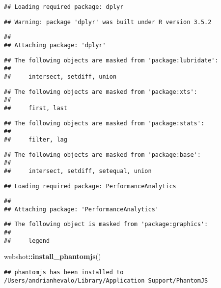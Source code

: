 \documentclass[]{article}
\newenvironment{Shaded}{\begin{snugshade}}{\end{snugshade}}
\newcommand{\KeywordTok}[1]{\textcolor[rgb]{0.13,0.29,0.53}{\textbf{#1}}}
\newcommand{\OperatorTok}[1]{\textcolor[rgb]{0.81,0.36,0.00}{\textbf{#1}}}
\newcommand{\NormalTok}[1]{#1}
\begin{document}
\begin{verbatim}
## Loading required package: dplyr
\end{verbatim}

\begin{verbatim}
## Warning: package 'dplyr' was built under R version 3.5.2
\end{verbatim}

\begin{verbatim}
## 
## Attaching package: 'dplyr'
\end{verbatim}

\begin{verbatim}
## The following objects are masked from 'package:lubridate':
## 
##     intersect, setdiff, union
\end{verbatim}

\begin{verbatim}
## The following objects are masked from 'package:xts':
## 
##     first, last
\end{verbatim}

\begin{verbatim}
## The following objects are masked from 'package:stats':
## 
##     filter, lag
\end{verbatim}

\begin{verbatim}
## The following objects are masked from 'package:base':
## 
##     intersect, setdiff, setequal, union
\end{verbatim}

\begin{verbatim}
## Loading required package: PerformanceAnalytics
\end{verbatim}

\begin{verbatim}
## 
## Attaching package: 'PerformanceAnalytics'
\end{verbatim}

\begin{verbatim}
## The following object is masked from 'package:graphics':
## 
##     legend
\end{verbatim}

\begin{Shaded}
\begin{Highlighting}[]
\NormalTok{webshot}\OperatorTok{::}\KeywordTok{install_phantomjs}\NormalTok{()}
\end{Highlighting}
\end{Shaded}

\begin{verbatim}
## phantomjs has been installed to /Users/andrianhevalo/Library/Application Support/PhantomJS
\end{verbatim}
\end{document}
